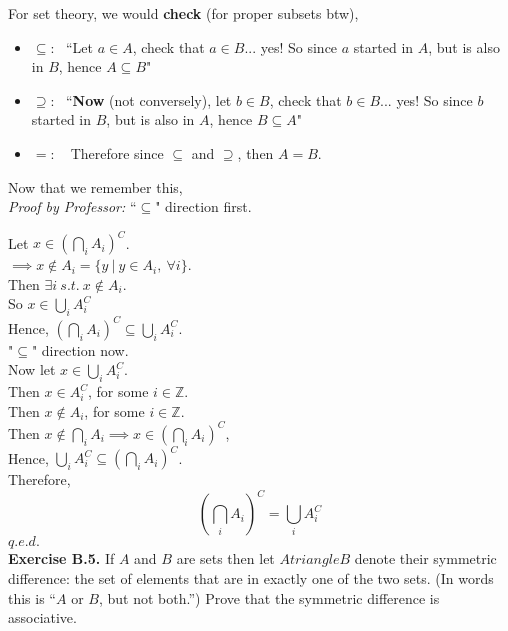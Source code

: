 \documentclass[12pt]{book}
\begin{document}
\noindent For set theory, we would \textbf{check} (for proper subsets btw), 
\begin{itemize}
\item $\subseteq :~~~$``Let $a \in A$, check that $a \in B$... yes! So since $a$ started in $A$, but is also in $B$, hence $A\subseteq B$"
\item $\supseteq :~~~$``\textbf{Now} (not conversely), let $b \in B$, check that $b \in B$... yes! So since $b$ started in $B$, but is also in $A$, hence $B\subseteq A$"
\item $=: ~~~$ Therefore since $\subseteq$ and $\supseteq$, then $A=B$.
\end{itemize}
Now that we remember this,\\

\noindent \textit{Proof by Professor:} ``$\subseteq$" direction first.

\noindent Let $x \in \left( \bigcap\limits_i A_i\right)^{C}$. \\

$\implies x \notin A_i=\{y~|~ y\in A_i,~\forall i\}$.\\

\noindent Then $\exists i~s.t.~ x\notin A_i$.\\
So $x \in \bigcup\limits_i A_i^{C}$\\
Hence, $\left( \bigcap\limits_i A_i\right)^{C}   \subseteq  \bigcup\limits_i A_i^{C}.$\\

\noindent"$\subseteq$" direction now.\\

\noindent Now let $x \in \bigcup\limits_i A_i^{C}$. \\
Then $x \in A_i^{C}$, for some $i\in \mathbb{Z}$.\\
Then $x \notin A_i$, for some $i\in \mathbb{Z}$.\\
Then $x \notin \bigcap\limits_i A_i \implies x\in \left( \bigcap\limits_i A_i\right)^{C}$,\\
Hence, $\bigcup\limits_i A_i^{C} \subseteq \left( \bigcap\limits_i A_i\right)^{C}$.\\

Therefore, \\
$$\left( \bigcap\limits_i A_i\right)^{C}=\bigcup\limits_i A_i^{C}$$\hfill$q.e.d.$\\


\noindent \textbf{Exercise B.5.} If $A$ and $B$ are sets then let $A triangle B$ denote their symmetric difference: the set of elements that are in exactly one of the two sets. (In words this is “$A$ or $B$, but not both.”) Prove that the symmetric difference is associative.\\
\end{document}
